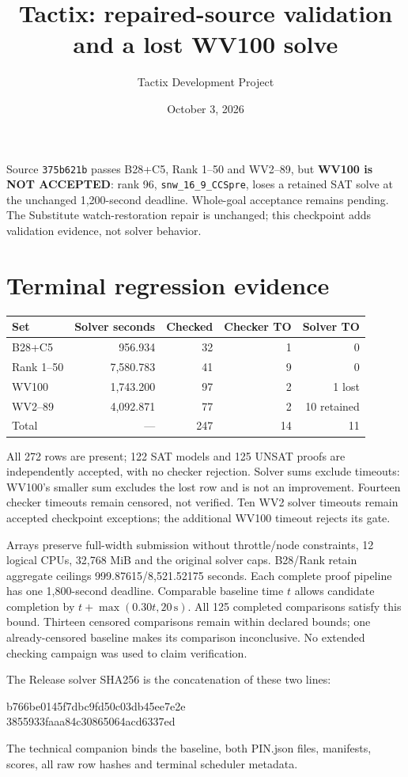 \documentclass[11pt]{article}
\title{Tactix: repaired-source validation and a lost WV100 solve}
\author{Tactix Development Project}
\date{October 3, 2026}
\begin{document}
\maketitle
Source \texttt{375b621b} passes B28+C5, Rank 1--50 and WV2--89, but
\textbf{WV100 is NOT ACCEPTED}: rank 96, \texttt{snw\_16\_9\_CCSpre}, loses a
retained SAT solve at the unchanged 1,200-second deadline. Whole-goal
acceptance remains pending. The Substitute watch-restoration repair is
unchanged; this checkpoint adds validation evidence, not solver behavior.

\section*{Terminal regression evidence}
\begin{center}
\begin{tabular}{lrrrr}
\toprule
Set & Solver seconds & Checked & Checker TO & Solver TO \\
\midrule
B28+C5 & 956.934 & 32 & 1 & 0 \\
Rank 1--50 & 7,580.783 & 41 & 9 & 0 \\
WV100 & 1,743.200 & 97 & 2 & 1 lost \\
WV2--89 & 4,092.871 & 77 & 2 & 10 retained \\
\midrule
Total & --- & 247 & 14 & 11 \\
\bottomrule
\end{tabular}
\end{center}
All 272 rows are present; 122 SAT models and 125 UNSAT proofs are independently
accepted, with no checker rejection. Solver sums exclude timeouts: WV100's
smaller sum excludes the lost row and is not an improvement. Fourteen checker
timeouts remain censored, not verified. Ten WV2 solver timeouts remain accepted
checkpoint exceptions; the additional WV100 timeout rejects its gate.

Arrays preserve full-width submission without throttle/node constraints,
12 logical CPUs, 32,768 MiB and the original solver caps. B28/Rank retain
aggregate ceilings 999.87615/8,521.52175 seconds. Each complete proof pipeline
has one 1,800-second deadline. Comparable baseline time $t$ allows candidate
completion by $t+\max(0.30t,20\,\mathrm{s})$. All 125 completed comparisons
satisfy this bound. Thirteen censored comparisons remain within declared
bounds; one already-censored baseline makes its comparison inconclusive.
No extended checking campaign was used to claim verification.

The Release solver SHA256 is the concatenation of these two lines:
\begin{center}
\small\ttfamily
b766be0145f7dbc9fd50c03db45ee7e2e\\
3855933faaa84c30865064acd6337ed
\end{center}
The technical companion binds the baseline, both PIN.json files, manifests,
scores, all raw row hashes and terminal scheduler metadata.
\end{document}
